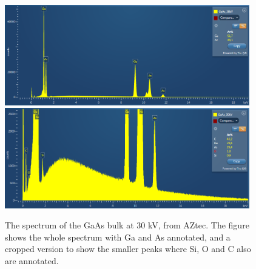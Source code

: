 \begin{figure}[p]
    \centering
    \includegraphics[width=0.95\textwidth]{figures/GaAs_30kV_SEM_lin.PNG}
    \\[2em]
    \includegraphics[width=0.95\textwidth]{figures/GaAs_30kV_SEM_lin_scaled.PNG}
    \caption{
        The spectrum of the GaAs bulk at 30 kV, from AZtec.
        The figure shows the whole spectrum with Ga and As annotated, and a cropped version to show the smaller peaks where Si, O and C also are annotated.
    }
    \label{fig:GaAs30kV_AZ}
\end{figure}



